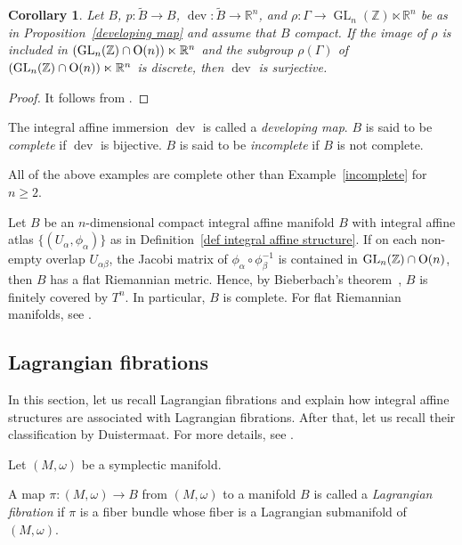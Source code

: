 \documentclass[pdftex]{sigma}
\numberwithin{equation}{section}
\newtheorem{Corollary}[Theorem]{Corollary}
\newcommand{\R}{\mathbb{R}}
\newcommand{\Z}{\mathbb{Z}}
\renewcommand{\tilde}{\widetilde}
\def\dev{\operatorname{dev}}
\def\GL{\operatorname{GL}}
\begin{document}
\begin{Corollary}
Let $B$, $p\colon \tilde B\to B$, $\dev\colon \tilde B\to \R^n$, and $\rho\colon \Gamma\to \GL_n(\Z)\ltimes \R^n$ be as in Proposition~{\rm\ref{developing map}} and assume that $B$ compact. If the image of $\rho$ is included in $(\GL_n(\Z)\cap {\rm O}(n))\ltimes \R^n$ and the subgroup $\rho(\Gamma )$ of $(\GL_n(\Z)\cap {\rm O}(n))\ltimes \R^n$ is discrete, then $\dev$ is surjective.
\end{Corollary}
\begin{proof}
It follows from \cite[Theorem~3.1.3]{Wolf}.
\end{proof}

\begin{Definition}
The integral affine immersion $\dev$ is called a \emph{developing map}. $B$ is said to be \emph{complete} if $\dev$ is bijective. $B$ is said to be \emph{incomplete} if $B$ is not complete.
\end{Definition}
\begin{Example}
All of the above examples are complete other than Example~\ref{incomplete} for $n\ge 2$.
\end{Example}

\begin{Example}
Let $B$ be an $n$-dimensional compact integral affine manifold $B$ with integral affine atlas $\{ (U_\alpha,\phi_\alpha)\}$ as in Definition~\ref{def integral affine structure}. If on each non-empty overlap $U_{\alpha\beta}$, the Jacobi matrix of $\phi_\alpha\circ \phi_\beta^{-1}$ is contained in $\GL_n(\Z)\cap {\rm O}(n)$, then $B$ has a flat Riemannian metric. Hence, by Bieberbach's theorem~\cite{Bie1, Bie2}, $B$ is finitely covered by $T^n$. In particular, $B$ is complete. For flat Riemannian manifolds, see \cite[Chapter~3]{Wolf}.
\end{Example}

\subsection{Lagrangian fibrations}\label{Lagrangian fibration}
In this section, let us recall Lagrangian fibrations and explain how integral affine structures are associated with Lagrangian fibrations. After that, let us recall their classification by Duistermaat. For more details, see \cite{Du,MR2587398,Y4}.

Let $(M,\omega)$ be a symplectic manifold.
\begin{Definition}
A map $\pi\colon (M,\omega)\to B$ from $(M,\omega)$ to a manifold $B$ is called a {\it Lagrangian fibration} if $\pi$ is a fiber bundle whose fiber is a Lagrangian submanifold of $(M,\omega)$.
\end{Definition}
\end{document}
